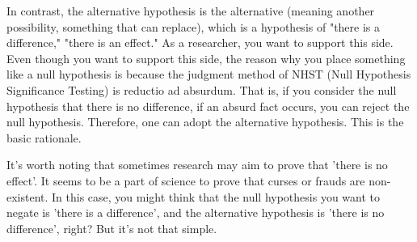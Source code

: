 \documentclass{ltjsbook}
\begin{document}
In contrast, the alternative hypothesis is the alternative (meaning another possibility, something that can replace), which is a hypothesis of "there is a difference," "there is an effect." As a researcher, you want to support this side. Even though you want to support this side, the reason why you place something like a null hypothesis is because the judgment method of NHST (Null Hypothesis Significance Testing) is reductio ad absurdum. That is, if you consider the null hypothesis that there is no difference, if an absurd fact occurs, you can reject the null hypothesis. Therefore, one can adopt the alternative hypothesis. This is the basic rationale.

It's worth noting that sometimes research may aim to prove that 'there is no effect'. It seems to be a part of science to prove that curses or frauds are non-existent. In this case, you might think that the null hypothesis you want to negate is 'there is a difference', and the alternative hypothesis is 'there is no difference', right? But it's not that simple.

\end{document}
